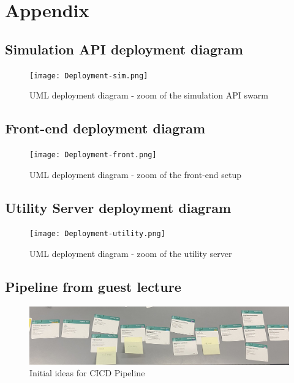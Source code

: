\section{Appendix}

\subsection{Simulation API deployment diagram}
\label{sec:dep_sim}
\begin{figure}[H]
    \centering
    \texttt{[image: Deployment-sim.png]}
    \caption{UML deployment diagram - zoom of the simulation API swarm}
    \label{fig:dep_sim}
\end{figure}

\subsection{Front-end deployment diagram}
\label{sec:dep_front}
\begin{figure}[H]
    \centering
    \texttt{[image: Deployment-front.png]}
    \caption{UML deployment diagram - zoom of the front-end setup}
    \label{fig:dep_front}
\end{figure}


\subsection{Utility Server deployment diagram}
\label{sec:dep_utility}
\begin{figure}[H]
    \centering
    \texttt{[image: Deployment-utility.png]}
    \caption{UML deployment diagram - zoom of the utility server}
    \label{fig:dep_utility}
\end{figure}


\subsection{Pipeline from guest lecture}
\begin{figure}[H]
    \centering \includegraphics[width=\textwidth,height=0.90\textheight,keepaspectratio]{images/CICD Pipeline.jpg}
    \caption{Initial ideas for CI\/CD Pipeline}
    \label{fig:CICD}
\end{figure}


